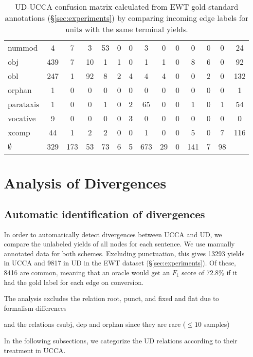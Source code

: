 \documentclass[11pt,a4paper]{article}
\begin{document}
\begin{table}[t]
\begin{tabular}{l|ccccccccccccc}
nummod & 4 & 7 & 3 & 53 & 0 & 0 & 3 & 0 & 0 & 0 & 0 & 0 & 24 \\
obj & 439 & 7 & 10 & 1 & 1 & 0 & 1 & 1 & 0 & 8 & 6 & 0 & 92 \\
obl & 247 & 1 & 92 & 8 & 2 & 4 & 4 & 4 & 0 & 0 & 2 & 0 & 132 \\
orphan & 1 & 0 & 0 & 0 & 0 & 0 & 0 & 0 & 0 & 0 & 0 & 0 & 1 \\
parataxis & 1 & 0 & 0 & 1 & 0 & 2 & 65 & 0 & 0 & 1 & 0 & 1 & 54 \\
vocative & 9 & 0 & 0 & 0 & 0 & 3 & 0 & 0 & 0 & 0 & 0 & 0 & 0 \\
xcomp & 44 & 1 & 2 & 2 & 0 & 0 & 1 & 0 & 0 & 5 & 0 & 7 & 116 \\
$\emptyset$ & 329 & 173 & 53 & 73 & 6 & 5 & 673 & 29 & 0 & 141 & 7 & 98
\end{tabular}
\caption{UD-UCCA confusion matrix calculated from EWT
gold-standard annotations (\S\ref{sec:experiments})
by comparing incoming edge labels for units with the same terminal yields.
\label{tab:confusion_matrix}}
\end{table}



\section{Analysis of Divergences}\label{sec:analysis}


\subsection{Automatic identification of divergences}

In order to automatically detect divergences between UCCA and UD,
we compare the unlabeled yields of all nodes for each sentence.
We use manually annotated data for both schemes.
Excluding punctuation, this gives 13293 yields in UCCA and
9817 in UD in the EWT dataset (\S\ref{sec:experiments}).
Of these, 8416 are common, meaning that an oracle would get an $F_1$ score
of 72.8\% if it had the gold label for each edge on conversion.

The analysis excludes the relation root, punct, and fixed and flat due to formalism differences

and the relations csubj, dep and orphan since they are rare
($\leq 10$ samples)

In the following subsections, we categorize the UD relations according to their
treatment in UCCA.
\end{document}
